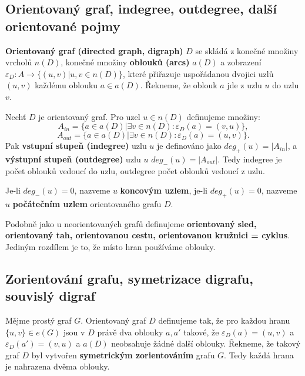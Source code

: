 \subsection{Orientovaný graf, indegree, outdegree, další orientované pojmy}

\begin{definition}
\textbf{Orientovaný graf (directed graph, digraph)} $D$ se skládá z konečné množiny vrcholů $n(D)$, konečné množiny \textbf{oblouků (arcs)} $a(D)$ a zobrazení $\varepsilon_D : A \rightarrow \{ (u, v) | u,v \in n(D) \}$, které přiřazuje uspořádanou dvojici uzlů $(u,v)$ každému oblouku $a \in a(D)$. Řekneme, že oblouk $a$ jde z uzlu $u$ do uzlu $v$.
\end{definition}

\begin{definition}
Nechť $D$ je orientovaný graf. Pro uzel $u \in n(D)$ definujeme množiny:
$$ A_{in} = \{ a \in a(D) | \exists v \in n(D) : \varepsilon_D (a) = (v, u) \},$$
$$A_{out} = \{ a \in a(D) | \exists v \in n(D) : \varepsilon_D (a) = (u, v) \}.$$
Pak \textbf{vstupní stupeň (indegree)} uzlu $u$ je definováno jako $deg_+ (u) = |A_{in}|$, a \textbf{výstupní stupeň (outdegree)} uzlu $u$ $deg_- (u) = |A_{out}|$. Tedy indegree je počet oblouků vedoucí do uzlu, outdegree počet oblouků vedoucí z uzlu.
\end{definition}

\begin{definition}
Je-li $deg_- (u) = 0$, nazveme $u$ \textbf{koncovým uzlem}, je-li $deg_+ (u) = 0$, nazveme $u$ \textbf{počátečním uzlem} orientovaného grafu $D$.
\end{definition}

\begin{definition}
Podobně jako u neorientovaných grafů definujeme \textbf{orientovaný sled, orientovaný tah, orientovanou cestu, orientovanou kružnici = cyklus}. Jediným rozdílem je to, že místo hran používáme oblouky.
\end{definition}

\subsection{Zorientování grafu, symetrizace digrafu, souvislý digraf}

\begin{definition}
Mějme prostý graf $G$. Orientovaný graf $D$ definujeme tak, že pro každou hranu $\{ u, v\} \in e(G)$ jsou v $D$ právě dva oblouky $a, a'$ takové, že $\varepsilon_D (a) = (u, v)$ a $\varepsilon_D (a') = (v,u)$ a $a(D)$ neobsahuje žádné další oblouky. Řekneme, že takový graf $D$ byl vytvořen \textbf{ symetrickým zorientováním} grafu $G$. Tedy každá hrana je nahrazena dvěma oblouky.
\end{definition}

